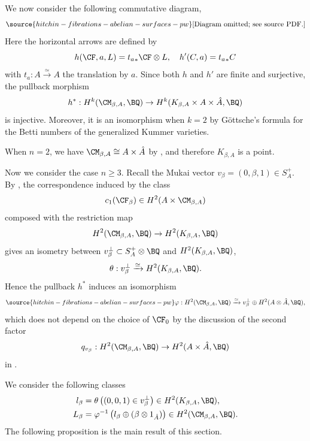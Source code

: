 We now consider the following commutative diagram,
\begin{equation}\label{diagram1}
\source{hitchin-fibrations-abelian-surfaces-pw}
    \text{[Diagram omitted; see source PDF.]}
\end{equation}
Here the horizontal arrows are defined by
\[
h(\CF, a, L) = {t_a}_* \CF \otimes  L,\quad h'(C, a)= {t_a}_\ast C
\]
with $t_a: A \xrightarrow{\simeq} A$ the translation by $a$. Since both $h$ and $h'$ are finite and surjective, the pullback morphism
\begin{equation*}
    h^*: H^k(\CM_{\beta, A}, \BQ) \to H^k(K_{\beta, A} \times A \times \hat{A}, \BQ)
\end{equation*}
is injective. Moreover, it is an isomorphism when $k=2$ by G\"ottsche's formula \cite{Go1} for the Betti numbers of the generalized Kummer varieties.

When $n =2$, we have $\CM_{\beta,A} \cong A \times \hat{A}$ by \cite{Yo}, and therefore $K_{\beta,A}$ is a point.

Now we consider the case $n \geq 3$. Recall the Mukai vector $v_\beta =(0,\beta ,1) \in S_A^+$. By \cite[Theorem 0.2 and (1.6)]{Yo}, the correspondence induced by the class
\[
c_1(\CF_\beta) \in H^2(A \times \CM_{\beta,A})
\]
composed with the restriction map
\[
H^2(\CM_{\beta,A}, \BQ) \to H^2(K_{\beta,A}, \BQ)
\]
gives an isometry between $v_\beta^\perp \subset S_A^+\otimes \BQ$ and $H^2(K_{\beta,A}, \BQ)$,
\[
\theta: v_\beta^\perp  \xrightarrow{\simeq}  H^2(K_{\beta,A}, \BQ).
\]
Hence the pullback $h^*$ induces an isomorphism
\begin{equation}\label{eqn39}
\source{hitchin-fibrations-abelian-surfaces-pw}
\varphi: H^2(\CM_{\beta, A}, \BQ) \xrightarrow{\simeq} v_\beta^\perp \oplus H^2(A\otimes \hat{A}, \BQ),
\end{equation}
which does not depend on the choice of $\CF_0$ by the discussion of the second factor
\[
q_{v_\beta}: H^2(\CM_{{\beta},A}, \BQ) \to H^2(A \times \hat{A}, \BQ)
\]
in \cite[Section 8, Page 40]{Markman3}.


We consider the following classes
\[
\begin{split}
    l_\beta & = \theta\left((0,0,1)\in v_\beta^\perp\right) \in H^2(K_{\beta,A} ,\BQ), \\
    L_\beta & = \varphi^{-1} \left( l_\beta \oplus (\beta\otimes 1_{\hat{A}}) \right) \in H^2(\CM_{\beta, A}, \BQ).
\end{split}
\]
The following proposition is the main result of this section.

